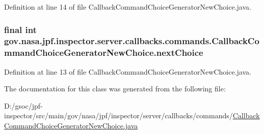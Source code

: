 Definition at line 14 of file Callback\+Command\+Choice\+Generator\+New\+Choice.\+java.

\subsubsection[{\texorpdfstring{next\+Choice}{nextChoice}}]{\setlength{\rightskip}{0pt plus 5cm}final int gov.\+nasa.\+jpf.\+inspector.\+server.\+callbacks.\+commands.\+Callback\+Command\+Choice\+Generator\+New\+Choice.\+next\+Choice\hspace{0.3cm}{\ttfamily [private]}}\hypertarget{classgov_1_1nasa_1_1jpf_1_1inspector_1_1server_1_1callbacks_1_1commands_1_1_callback_command_choice_generator_new_choice_acd76b0a631b4006a246c68bb3d3f6dea}{}\label{classgov_1_1nasa_1_1jpf_1_1inspector_1_1server_1_1callbacks_1_1commands_1_1_callback_command_choice_generator_new_choice_acd76b0a631b4006a246c68bb3d3f6dea}


Definition at line 13 of file Callback\+Command\+Choice\+Generator\+New\+Choice.\+java.



The documentation for this class was generated from the following file\+:\begin{DoxyCompactItemize}
\item 
D\+:/gsoc/jpf-\/inspector/src/main/gov/nasa/jpf/inspector/server/callbacks/commands/\hyperlink{_callback_command_choice_generator_new_choice_8java}{Callback\+Command\+Choice\+Generator\+New\+Choice.\+java}\end{DoxyCompactItemize}
